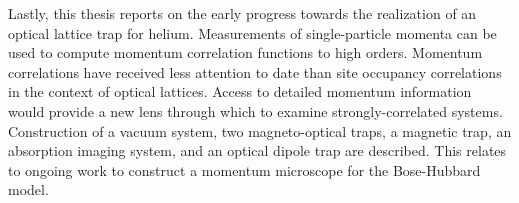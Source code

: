 Lastly, this thesis reports on the early progress towards the realization of an optical lattice trap for helium.
Measurements of single-particle momenta can be used to compute momentum correlation functions to high orders.
Momentum correlations have received less attention to date than site occupancy correlations in the context of optical lattices.
Access to detailed momentum information would provide a new lens through which to examine strongly-correlated systems.
Construction of a vacuum system, two magneto-optical traps, a magnetic trap, an absorption imaging system, and an optical dipole trap are described.
This relates to ongoing work to construct a momentum microscope for the Bose-Hubbard model.










